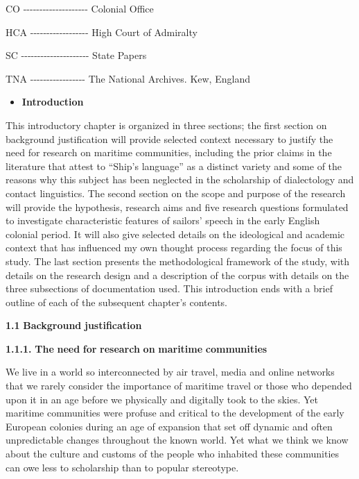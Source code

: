 CO -{}-{}-{}-{}-{}-{}-{}-{}-{}-{}-{}-{}-{}-{}-{}-{}-{}-{}-{}-  Colonial Office

HCA -{}-{}-{}-{}-{}-{}-{}-{}-{}-{}-{}-{}-{}-{}-{}-{}-{}-  High Court of Admiralty

SC -{}-{}-{}-{}-{}-{}-{}-{}-{}-{}-{}-{}-{}-{}-{}-{}-{}-{}-{}-{}-  State Papers

TNA -{}-{}-{}-{}-{}-{}-{}-{}-{}-{}-{}-{}-{}-{}-{}-{}-  The National Archives. Kew, England

\begin{itemize}
\item \begin{styleNormali}
\textbf{Introduction}
\end{styleNormali}
\end{itemize}
\begin{styleNormali}
This introductory chapter is organized in three sections; the first section on background justification will provide selected context necessary to justify the need for research on maritime communities, including the prior claims in the literature that attest to “Ship’s language” as a distinct variety and some of the reasons why this subject has been neglected in the scholarship of dialectology and contact linguistics. The second section on the scope and purpose of the research will provide the hypothesis, research aims and five research questions formulated to investigate characteristic features of sailors’ speech in the early English colonial period. It will also give selected details on the ideological and academic context that has influenced my own thought process regarding the focus of this study. The last section presents the methodological framework of the study, with details on the research design and a description of the corpus with details on the three subsections of documentation used. This introduction ends with a brief outline of each of the subsequent chapter’s contents.
\end{styleNormali}

\begin{styleNormali}
\textbf{1.1} \textbf{Background} \textbf{justification} 
\end{styleNormali}

\begin{styleNormali}
\textbf{1.1.1.} \textbf{The} \textbf{need} \textbf{for} \textbf{research} \textbf{on} \textbf{maritime} \textbf{communities}
\end{styleNormali}

\begin{styleNormali}
We live in a world so interconnected by air travel, media and online networks that we rarely consider the importance of maritime travel or those who depended upon it in an age before we physically and digitally took to the skies. Yet maritime communities were profuse and critical to the development of the early European colonies during an age of expansion that set off dynamic and often unpredictable changes throughout the known world. Yet what we think we know about the culture and customs of the people who inhabited these communities can owe less to scholarship than to popular stereotype. 
\end{styleNormali}

